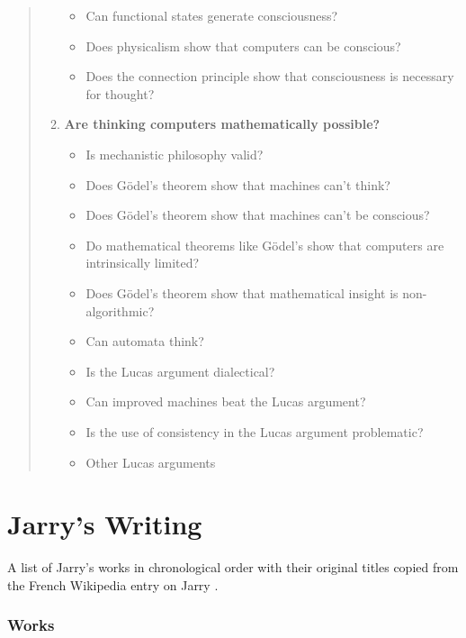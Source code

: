 \begin{quotation}
\begin{enumerate}
\begin{itemize}
        \item Can functional states generate consciousness?
        \item Does physicalism show that computers can be conscious?
        \item Does the connection principle show that consciousness is necessary for thought?
      \end{itemize}
    \item \textbf{Are thinking computers mathematically possible?}
      \begin{itemize}
        \item Is mechanistic philosophy valid?
        \item Does G{\"o}del's theorem show that machines can't think?
        \item Does G{\"o}del's theorem show that machines can't be conscious?
        \item Do mathematical theorems like G{\"o}del's show that computers are intrinsically limited?
        \item Does G{\"o}del's theorem show that mathematical insight is non-algorithmic?
        \item Can automata think?
        \item Is the Lucas argument dialectical?
        \item Can improved machines beat the Lucas argument?
        \item Is the use of consistency in the Lucas argument problematic?
        \item Other Lucas arguments
      \end{itemize}
  \end{enumerate}
\end{quotation}


\section{Jarry's Writing}
\label{s:jarry}

A list of Jarry's works in chronological order with their original titles copied from the French Wikipedia entry on Jarry \autocite*{WikiJarry2016}.

\subsubsection{Works}

